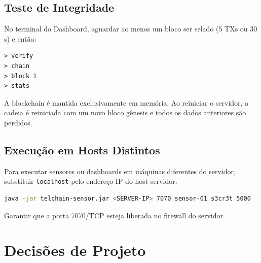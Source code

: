 \documentclass[12pt, a4paper]{article}
\begin{document}
\subsection{Teste de Integridade}

No terminal do Dashboard, aguardar ao menos um bloco ser selado (5 TXs ou 30 s) e então:

\begin{lstlisting}[caption={Sessão de auditoria no Dashboard.}]
> verify
> chain
> block 1
> stats
\end{lstlisting}

\begin{warnbox}[Atenção]
A blockchain é mantida exclusivamente em memória. Ao reiniciar o servidor, a cadeia é
reiniciada com um novo bloco gênesis e todos os dados anteriores são perdidos.
\end{warnbox}

\subsection{Execução em Hosts Distintos}

Para executar sensores ou dashboards em máquinas diferentes do servidor, substituir
\texttt{localhost} pelo endereço IP do host servidor:

\begin{lstlisting}[language=bash, caption={Conexão remota.}]
java -jar telchain-sensor.jar <SERVER-IP> 7070 sensor-01 s3cr3t 5000
\end{lstlisting}

Garantir que a porta 7070/TCP esteja liberada no firewall do servidor.


\section{Decisões de Projeto}
\end{document}
